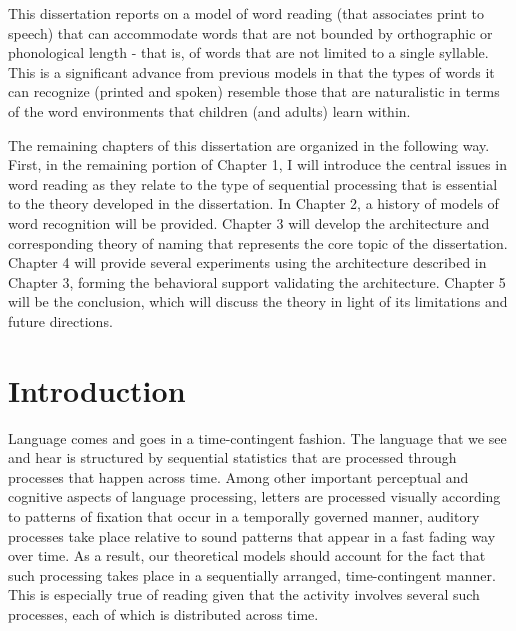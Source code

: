 \documentclass[
  american,
  man,floatsintext]{apa6}
\begin{document}
This dissertation reports on a model of word reading (that associates print to speech) that can accommodate words that are not bounded by orthographic or phonological length - that is, of words that are not limited to a single syllable. This is a significant advance from previous models in that the types of words it can recognize (printed and spoken) resemble those that are naturalistic in terms of the word environments that children (and adults) learn within.

The remaining chapters of this dissertation are organized in the following way. First, in the remaining portion of Chapter 1, I will introduce the central issues in word reading as they relate to the type of sequential processing that is essential to the theory developed in the dissertation. In Chapter 2, a history of models of word recognition will be provided. Chapter 3 will develop the architecture and corresponding theory of naming that represents the core topic of the dissertation. Chapter 4 will provide several experiments using the architecture described in Chapter 3, forming the behavioral support validating the architecture. Chapter 5 will be the conclusion, which will discuss the theory in light of its limitations and future directions.

\hypertarget{introduction}{%
\section{Introduction}\label{introduction}}

Language comes and goes in a time-contingent fashion. The language that we see and hear is structured by sequential statistics that are processed through processes that happen across time. Among other important perceptual and cognitive aspects of language processing, letters are processed visually according to patterns of fixation that occur in a temporally governed manner, auditory processes take place relative to sound patterns that appear in a fast fading way over time. As a result, our theoretical models should account for the fact that such processing takes place in a sequentially arranged, time-contingent manner. This is especially true of reading given that the activity involves several such processes, each of which is distributed across time.
\end{document}
